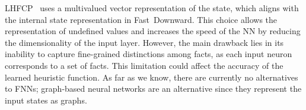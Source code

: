 LHFCP~\cite{Geissmann/2015} uses a multivalued \sas vector representation of the state, which aligns with the internal state representation in Fast~Downward. This choice allows the representation of undefined values and increases the speed of the NN by reducing the dimensionality of the input layer. However, the main drawback lies in its inability to capture fine-grained distinctions among facts, as each input neuron corresponds to a set of facts. This limitation could affect the accuracy of the learned heuristic function. As far as we know, there are currently no alternatives to FNNs; graph-based neural networks \cite{Shen.etal/2020} are an alternative since they represent the input states as graphs.
